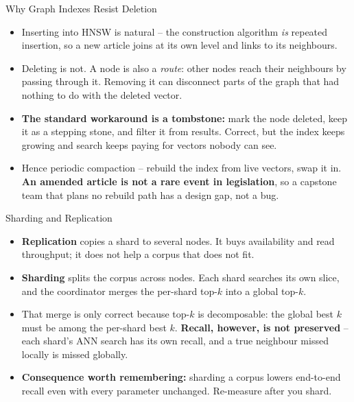\begin{frame}{Why Graph Indexes Resist Deletion}
\begin{itemize}
  \item Inserting into HNSW is natural -- the construction algorithm \emph{is} repeated insertion, so a new article joins at its own level and links to its neighbours.
  \pause
  \item Deleting is not. A node is also a \emph{route}: other nodes reach their neighbours by passing through it. Removing it can disconnect parts of the graph that had nothing to do with the deleted vector.
  \pause
  \item \textbf{The standard workaround is a tombstone:} mark the node deleted, keep it as a stepping stone, and filter it from results. Correct, but the index keeps growing and search keeps paying for vectors nobody can see.
  \pause
  \item Hence periodic compaction -- rebuild the index from live vectors, swap it in. \textbf{An amended article is not a rare event in legislation}, so a capstone team that plans no rebuild path has a design gap, not a bug.
\end{itemize}
\end{frame}

\begin{frame}{Sharding and Replication}
\begin{itemize}
  \item \textbf{Replication} copies a shard to several nodes. It buys availability and read throughput; it does not help a corpus that does not fit.
  \pause
  \item \textbf{Sharding} splits the corpus across nodes. Each shard searches its own slice, and the coordinator merges the per-shard top-$k$ into a global top-$k$.
  \pause
  \item That merge is only correct because top-$k$ is decomposable: the global best $k$ must be among the per-shard best $k$. \textbf{Recall, however, is not preserved} -- each shard's ANN search has its own recall, and a true neighbour missed locally is missed globally.
  \pause
  \item \textbf{Consequence worth remembering:} sharding a corpus lowers end-to-end recall even with every parameter unchanged. Re-measure after you shard.
\end{itemize}
\end{frame}

